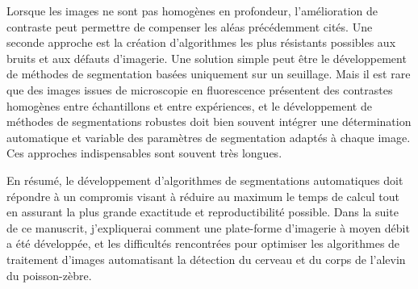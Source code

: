 \documentclass[\main/main.tex]{subfiles}
\begin{document}
%
Lorsque les images ne sont pas homogènes en profondeur, l'amélioration de contraste peut permettre de compenser les aléas précédemment cités.
%
Une seconde approche est la création d'algorithmes les plus résistants possibles aux bruits et aux défauts d'imagerie.
Une solution simple peut être le développement de méthodes de segmentation basées uniquement sur un seuillage.
%
 Mais il est rare que des images issues de microscopie en fluorescence présentent des contrastes homogènes entre échantillons et entre expériences, et le développement de méthodes de segmentations robustes doit bien souvent intégrer une détermination automatique et variable des paramètres de segmentation adaptés à chaque image.
 Ces approches indispensables sont souvent très longues.
 
 En résumé, le développement d'algorithmes de segmentations automatiques doit répondre à un compromis visant à réduire au maximum le temps de calcul tout en assurant la plus grande exactitude et reproductibilité possible.
%
Dans la suite de ce manuscrit, j'expliquerai comment une plate-forme d'imagerie à moyen débit a été développée, et les difficultés rencontrées pour optimiser les algorithmes de traitement d'images automatisant la détection du cerveau et du corps de l'alevin du poisson-zèbre.
\end{document}
